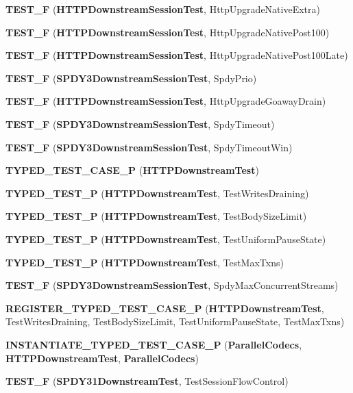 \begin{DoxyCompactItemize}
\item 
{\bf T\+E\+S\+T\+\_\+F} ({\bf H\+T\+T\+P\+Downstream\+Session\+Test}, Http\+Upgrade\+Native\+Extra)
\item 
{\bf T\+E\+S\+T\+\_\+F} ({\bf H\+T\+T\+P\+Downstream\+Session\+Test}, Http\+Upgrade\+Native\+Post100)
\item 
{\bf T\+E\+S\+T\+\_\+F} ({\bf H\+T\+T\+P\+Downstream\+Session\+Test}, Http\+Upgrade\+Native\+Post100\+Late)
\item 
{\bf T\+E\+S\+T\+\_\+F} ({\bf S\+P\+D\+Y3\+Downstream\+Session\+Test}, Spdy\+Prio)
\item 
{\bf T\+E\+S\+T\+\_\+F} ({\bf H\+T\+T\+P\+Downstream\+Session\+Test}, Http\+Upgrade\+Goaway\+Drain)
\item 
{\bf T\+E\+S\+T\+\_\+F} ({\bf S\+P\+D\+Y3\+Downstream\+Session\+Test}, Spdy\+Timeout)
\item 
{\bf T\+E\+S\+T\+\_\+F} ({\bf S\+P\+D\+Y3\+Downstream\+Session\+Test}, Spdy\+Timeout\+Win)
\item 
{\bf T\+Y\+P\+E\+D\+\_\+\+T\+E\+S\+T\+\_\+\+C\+A\+S\+E\+\_\+P} ({\bf H\+T\+T\+P\+Downstream\+Test})
\item 
{\bf T\+Y\+P\+E\+D\+\_\+\+T\+E\+S\+T\+\_\+P} ({\bf H\+T\+T\+P\+Downstream\+Test}, Test\+Writes\+Draining)
\item 
{\bf T\+Y\+P\+E\+D\+\_\+\+T\+E\+S\+T\+\_\+P} ({\bf H\+T\+T\+P\+Downstream\+Test}, Test\+Body\+Size\+Limit)
\item 
{\bf T\+Y\+P\+E\+D\+\_\+\+T\+E\+S\+T\+\_\+P} ({\bf H\+T\+T\+P\+Downstream\+Test}, Test\+Uniform\+Pause\+State)
\item 
{\bf T\+Y\+P\+E\+D\+\_\+\+T\+E\+S\+T\+\_\+P} ({\bf H\+T\+T\+P\+Downstream\+Test}, Test\+Max\+Txns)
\item 
{\bf T\+E\+S\+T\+\_\+F} ({\bf S\+P\+D\+Y3\+Downstream\+Session\+Test}, Spdy\+Max\+Concurrent\+Streams)
\item 
{\bf R\+E\+G\+I\+S\+T\+E\+R\+\_\+\+T\+Y\+P\+E\+D\+\_\+\+T\+E\+S\+T\+\_\+\+C\+A\+S\+E\+\_\+P} ({\bf H\+T\+T\+P\+Downstream\+Test}, Test\+Writes\+Draining, Test\+Body\+Size\+Limit, Test\+Uniform\+Pause\+State, Test\+Max\+Txns)
\item 
{\bf I\+N\+S\+T\+A\+N\+T\+I\+A\+T\+E\+\_\+\+T\+Y\+P\+E\+D\+\_\+\+T\+E\+S\+T\+\_\+\+C\+A\+S\+E\+\_\+P} ({\bf Parallel\+Codecs}, {\bf H\+T\+T\+P\+Downstream\+Test}, {\bf Parallel\+Codecs})
\item 
{\bf T\+E\+S\+T\+\_\+F} ({\bf S\+P\+D\+Y31\+Downstream\+Test}, Test\+Session\+Flow\+Control)
\item 

\end{DoxyCompactItemize}
